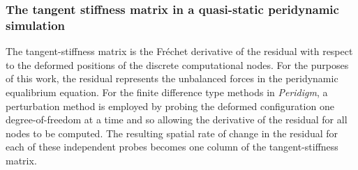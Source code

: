 \documentclass[preprint,12pt]{elsarticle}
\begin{document}
\subsubsection{The tangent stiffness matrix in a quasi-static peridynamic simulation}
The tangent-stiffness matrix is the Fr\'{e}chet derivative of the residual with respect to the deformed positions of the discrete computational nodes.  For the purposes of this work, the residual represents the unbalanced forces in the peridynamic equalibrium equation.  For the finite difference type methods in \emph{Peridigm}, a perturbation method is employed by probing the deformed configuration one degree-of-freedom at a time and so allowing the derivative of the residual for all nodes to be computed.  The resulting spatial rate of change in the residual for each of these independent probes becomes one column of the tangent-stiffness matrix.
\end{document}
